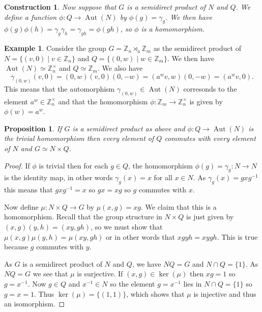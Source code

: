 \documentclass{amsart}
\DeclareMathOperator{\Aut}      {Aut}
\newcommand{\Z}         {{\mathbb{Z}}}
\newcommand{\st}        {\;|\;}
\newcommand{\tm}        {\times}
\newcommand{\xra}       {\xrightarrow}
\newcommand{\gm}        {\gamma}
\renewcommand{\:}{\colon}
\newtheorem{construction}[theorem]{Construction}
\newtheorem{proposition}[theorem]{Proposition}
\theoremstyle{definition}
\newtheorem{example}[theorem]{Example}
\begin{document}
\begin{construction}
 Now suppose that $G$ is a semidirect product of $N$ and $Q$.  We
 define a function $\phi\:Q\xra{}\Aut(N)$ by $\phi(g)=\gm_g$.  We then
 have $\phi(g)\phi(h)=\gm_g\gm_h=\gm_{gh}=\phi(gh)$, so $\phi$ is a
 homomorphism. 
\end{construction}

\begin{example}
 Consider the group $G=\Z_n\rtimes_a\Z_m$ as the semidirect product of
 $N=\{(v,0)\st v\in\Z_n\}$ and $Q=\{(0,w)\st w\in\Z_m\}$.  We then
 have $\Aut(N)\simeq\Z_n^\tm$ and $Q\simeq\Z_m$.  We also have 
 \[ \gm_{(0,w)}(v,0)=(0,w)(v,0)(0,-w)=(a^wv,w)(0,-w)=(a^wv,0). \]
 This means that the automorphism $\gm_{(0,w)}\in\Aut(N)$ corresonds
 to the element $a^w\in\Z_n^\tm$ and that the homomorphism
 $\phi\:\Z_m\xra{}\Z_n^\tm$ is given by $\phi(w)=a^w$.
\end{example}

\begin{proposition}
 If $G$ is a semidirect product as above and $\phi\:Q\xra{}\Aut(N)$ is
 the trivial homomorphism then every element of $Q$ commutes with
 every element of $N$ and $G\simeq N\tm Q$.
\end{proposition}
\begin{proof}
 If $\phi$ is trivial then for each $g\in Q$, the homomorphism
 $\phi(g)=\gm_g\:N\xra{}N$ is the identity map, in other words
 $\gm_g(x)=x$ for all $x\in N$.  As $\gm_g(x)=gxg^{-1}$ this means
 that $gxg^{-1}=x$ so $gx=xg$ so $g$ commutes with $x$.

 Now define $\mu\:N\tm Q\xra{}G$ by $\mu(x,g)=xg$.  We claim that this
 is a homomorphism.  Recall that the group structure in $N\tm Q$ is
 just given by $(x,g)(y,h)=(xy,gh)$, so we must show that
 $\mu(x,g)\mu(y,h)=\mu(xy,gh)$ or in other words that $xgyh=xygh$.
 This is true because $g$ commutes with $y$.

 As $G$ is a semidirect product of $N$ and $Q$, we have $NQ=G$ and
 $N\cap Q=\{1\}$.  As $NQ=G$ we see that $\mu$ is surjective.  If
 $(x,g)\in\ker(\mu)$ then $xg=1$ so $g=x^{-1}$.  Now $g\in Q$ and
 $x^{-1}\in N$ so the element $g=x^{-1}$ lies in $N\cap Q=\{1\}$ so
 $g=x=1$.  Thus $\ker(\mu)=\{(1,1)\}$, which shows that $\mu$ is
 injective and thus an isomorphism.
\end{proof}
\end{document}
